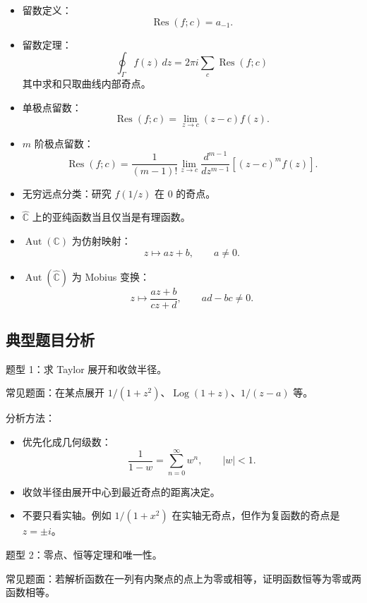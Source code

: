 \documentclass{article}
\newcommand{\C}{\mathbb{C}}
\newcommand{\Aut}{\operatorname{Aut}}
\DeclareMathOperator{\Log}{Log}
\begin{document}
\begin{itemize}
  \begin{itemize}
  \item
    可去：无负幂项。
  \item
  \(m\) 阶极点：最低负幂为 \((z-c)^{-m}\)。
  \item
    本性：有无限多个非零负幂项。
  \end{itemize}
\item
  留数定义： \[
  \operatorname{Res}(f;c)=a_{-1}.
  \]
\item
  留数定理： \[
  \oint_\Gamma f(z)\,dz=2\pi i\sum_c \operatorname{Res}(f;c)
  \] 其中求和只取曲线内部奇点。
\item
  单极点留数： \[
  \operatorname{Res}(f;c)=\lim_{z\to c}(z-c)f(z).
  \]
\item
  $m$ 阶极点留数： \[
  \operatorname{Res}(f;c)=
  \frac{1}{(m-1)!}\lim_{z\to c}
  \frac{d^{m-1}}{dz^{m-1}}\left[(z-c)^m f(z)\right].
  \]
\item
  无穷远点分类：研究 $f(1/z)$ 在 $0$ 的奇点。
\item
  \(\widehat{\mathbb C}\) 上的亚纯函数当且仅当是有理函数。
\item
  $\Aut(\C)$ 为仿射映射： \[
  z\mapsto az+b,\qquad a\ne 0.
  \]
\item
  \(\operatorname{Aut}(\widehat{\mathbb C})\) 为 Mobius 变换： \[
  z\mapsto \frac{az+b}{cz+d},\qquad ad-bc\ne 0.
  \]
\end{itemize}

\subsection{典型题目分析}

题型 1：求 Taylor 展开和收敛半径。

常见题面：在某点展开
\(1/(1+z^2)\)、\(\Log(1+z)\)、\(1/(z-a)\) 等。

分析方法：

\begin{itemize}
\item
  优先化成几何级数： \[
  \frac{1}{1-w}=\sum_{n=0}^\infty w^n,\qquad |w|<1.
  \]
\item
  收敛半径由展开中心到最近奇点的距离决定。
\item
  不要只看实轴。例如 \(1/(1+x^2)\)
  在实轴无奇点，但作为复函数的奇点是 \(z=\pm i\)。
\end{itemize}

题型 2：零点、恒等定理和唯一性。

常见题面：若解析函数在一列有内聚点的点上为零或相等，证明函数恒等为零或两函数相等。
\end{document}
